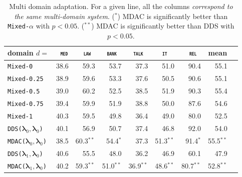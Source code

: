 \documentclass[11pt]{article}
\newcommand{\domain}[1]{\texttt{\textsc{#1}}}
\newcommand{\system}[1]{\texttt{{#1}}}
\newcommand{\vlambda}{\ensuremath{\boldsymbol\lambda}\xspace} %
\begin{document}
\begin{table}[htbp]
  \centering \small
  \begin{tabular}{|l|*8{r|}} \hline
    domain \hfill $d=$ & \multicolumn{1}{c|}{\domain{ med}} & \multicolumn{1}{c|}{\domain{ law}} & \multicolumn{1}{c|}{\domain{bank}} & \multicolumn{1}{c|}{\domain{talk}} & \multicolumn{1}{c|}{\domain{ it }} & \multicolumn{1}{c|}{\domain{ rel}} & \multicolumn{1}{c|}{mean} \\ \hline \hline
    \system{Mixed-0} &38.6&59.3&53.7&37.3&51.0&90.4&55.1\\
    \system{Mixed-0.25}&38.9&59.6&53.3&37.6&50.5&90.6&55.1\\
    \system{Mixed-0.5}&39.0&60.2&52.5&38.5&51.9&90.3&55.4\\
    \system{Mixed-0.75}&39.4&59.9&51.9&38.8&50.0&87.6&54.6\\
    \system{Mixed-1}&40.3&59.5&49.8&36.4&49.0&80.0&52.5\\
    \hline \hline
    \system{DDS($\vlambda_0, \vlambda_0$)} &40.1&56.9&50.7&37.4&46.8&92.0&54.0\\ 
    \system{MDAC($\vlambda_0, \vlambda_0$)}&38.5&60.3$^{**}$&54.4$^*$&37.3&51.3$^{**}$&91.4$^*$&55.5$^{**}$\\ 
    \hline \hline
    \system{DDS($\vlambda_1, \vlambda_0$)} &40.6&55.5&48.0&36.2&46.9&60.1&47.9\\
    \system{MDAC($\vlambda_1, \vlambda_0$)}&40.2&59.3$^{**}$&51.0$^{**}$&36.9$^{**}$&48.6$^{**}$&80.7$^{**}$&52.8$^{**}$\\
    \hline
  \end{tabular}
  \caption{Multi domain adaptation. For a given line, all the columns \emph{correspond to the same multi-domain system}. ($^*$) MDAC is significantly better than \system{Mixed-$\alpha$} with $p<0.05$. ($^{**}$) MDAC is significantly better than DDS with $p<0.05$.}
  \label{tab:multi-da}
\end{table}
\end{document}
